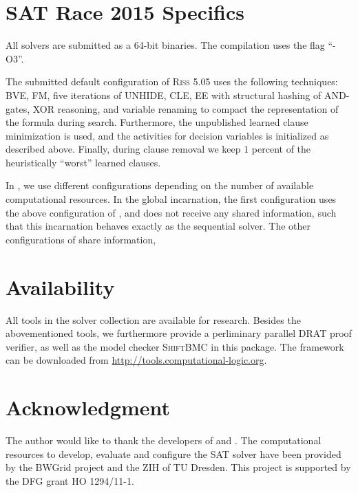 \documentclass[conference]{IEEEtran}
\begin{document}

 
\section{SAT Race 2015 Specifics}

All solvers are submitted as a 64-bit binaries. 
The compilation uses the flag ``-O3''. 

The submitted default configuration of \textsc{Riss 5.05} uses the following techniques:
%
BVE, 
FM, 
five iterations of UNHIDE,
CLE,
EE with structural hashing of AND-gates,
XOR reasoning, 
and variable renaming to compact the representation of the formula during search. 
Furthermore, the unpublished learned clause minimization is used, and the activities for decision variables is initialized as described above. 
Finally, during clause removal we keep $1$ percent of the heuristically ``worst'' learned clauses.

In \pcasso, we use different configurations depending on the number of available computational resources. 
In the global \priss incarnation, the first configuration uses the above configuration of \riss, and does not receive any shared information, such that this incarnation behaves exactly as the sequential solver. 
The other configurations of \priss share information,


\section{Availability}

All tools in the solver collection are available for research. 
Besides the abovementioned tools, we furthermore provide a perliminary parallel DRAT proof verifier, as well as the model checker \textsc{ShiftBMC} in this package.
The framework can be downloaded from \url{http://tools.computational-logic.org}.

\section*{Acknowledgment}
The author would like to thank the developers of \glucose and \minisat. 
The computational resources to develop, evaluate and configure the SAT solver have been provided by the BWGrid \cite{bwgrid} project and the ZIH of TU Dresden. 
This project is supported by the DFG grant HO 1294/11-1. 



% 


\end{document}
